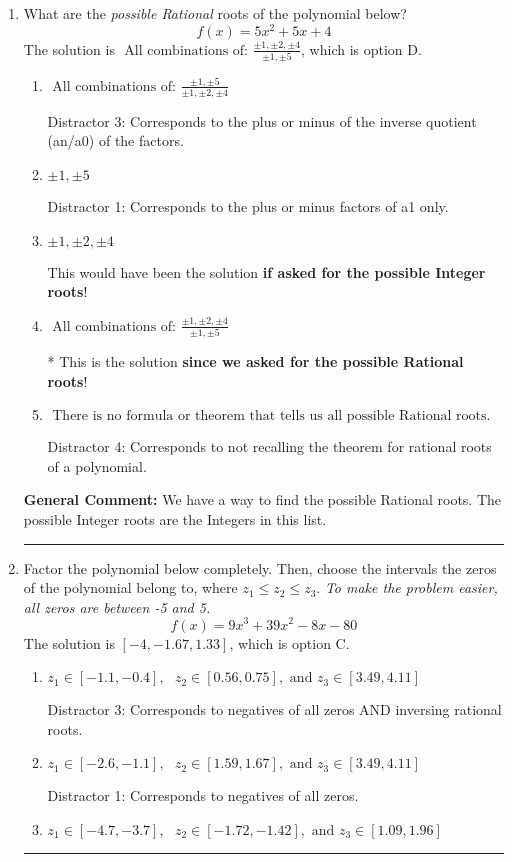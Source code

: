 \documentclass{extbook}[14pt]
\newcommand{\litem}[1]{\item #1

\rule{\textwidth}{0.4pt}}
\begin{document}
\begin{enumerate}\litem{
What are the \textit{possible Rational} roots of the polynomial below?
\[ f(x) = 5x^{2} +5 x + 4 \]The solution is \( \text{ All combinations of: }\frac{\pm 1,\pm 2,\pm 4}{\pm 1,\pm 5} \), which is option D.\begin{enumerate}[label=\Alph*.]
\item \( \text{ All combinations of: }\frac{\pm 1,\pm 5}{\pm 1,\pm 2,\pm 4} \)

 Distractor 3: Corresponds to the plus or minus of the inverse quotient (an/a0) of the factors. 
\item \( \pm 1,\pm 5 \)

 Distractor 1: Corresponds to the plus or minus factors of a1 only.
\item \( \pm 1,\pm 2,\pm 4 \)

This would have been the solution \textbf{if asked for the possible Integer roots}!
\item \( \text{ All combinations of: }\frac{\pm 1,\pm 2,\pm 4}{\pm 1,\pm 5} \)

* This is the solution \textbf{since we asked for the possible Rational roots}!
\item \( \text{ There is no formula or theorem that tells us all possible Rational roots.} \)

 Distractor 4: Corresponds to not recalling the theorem for rational roots of a polynomial.
\end{enumerate}

\textbf{General Comment:} We have a way to find the possible Rational roots. The possible Integer roots are the Integers in this list.
}
\litem{
Factor the polynomial below completely. Then, choose the intervals the zeros of the polynomial belong to, where $z_1 \leq z_2 \leq z_3$. \textit{To make the problem easier, all zeros are between -5 and 5.}
\[ f(x) = 9x^{3} +39 x^{2} -8 x -80 \]The solution is \( [-4, -1.67, 1.33] \), which is option C.\begin{enumerate}[label=\Alph*.]
\item \( z_1 \in [-1.1, -0.4], \text{   }  z_2 \in [0.56, 0.75], \text{   and   } z_3 \in [3.49, 4.11] \)

 Distractor 3: Corresponds to negatives of all zeros AND inversing rational roots.
\item \( z_1 \in [-2.6, -1.1], \text{   }  z_2 \in [1.59, 1.67], \text{   and   } z_3 \in [3.49, 4.11] \)

 Distractor 1: Corresponds to negatives of all zeros.
\item \( z_1 \in [-4.7, -3.7], \text{   }  z_2 \in [-1.72, -1.42], \text{   and   } z_3 \in [1.09, 1.96] \)


\end{enumerate}}
\end{enumerate}
\end{document}
